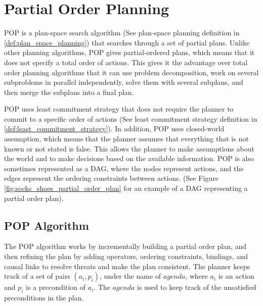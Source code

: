 \section{Partial Order Planning} \label{sec:partial_order_planning}
\acf{POP} is a plan-space search algorithm (See plan-space planning definition in \ref{def:plan_space_planning}) that searches through a set of partial plans.
Unlike other planning algorithms, \ac{POP} gives partial-ordered plans, which means that it does not specify a total order of actions.
This gives it the advantage over total order planning algorithms that it can use problem decomposition, work
on several subproblems in parallel independently, solve them with several subplans, and then merge the subplans into a final plan.


\ac{POP} uses least commitment strategy that does not require the planner to commit to a specific order of actions (See least commitment strategy definition in \ref{def:least_commitment_strategy}). In addition, \ac{POP} uses closed-world assumption, which means that the planner assumes that everything that is not known or not stated is false. This allows the planner to make assumptions about the world and to make decisions based on the available information.
\ac{POP} is also sometimes represented as a \acf{DAG}, where the nodes represent actions, and the edges represent the ordering constraints between actions. (See Figure \ref{fig:socks_shoes_partial_order_plan} for an example of a \ac{DAG} representing a partial order plan).

\subsection{POP Algorithm} \label{subsec:pop_algorithm}
The \acf{POP} algorithm works by incrementally building a partial order plan, and then refining the plan by adding operators, ordering constraints,
bindings, and causal links to resolve threats and make the plan consistent.
The planner keeps track of a set of pairs $(a_i, p_i)$, under the name of $agenda$, where $a_i$ is an action and $p_i$ is a precondition of $a_i$. The $agenda$ is used to keep track of the unsatisfied preconditions in the plan.


